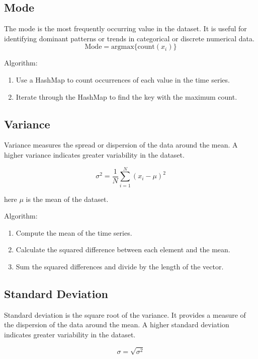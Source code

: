 \subsection{Mode}
The mode is the most frequently occurring value in the dataset. It is useful for identifying dominant patterns or trends in categorical or discrete numerical data.
\begin{equation}
    \text{Mode} = \text{arg} \text{max} \{ \text{count}(x_i) \}
\end{equation}

Algorithm:
\begin{enumerate}
    \item Use a HashMap to count occurrences of each value in the time series. 
    \item Iterate through the HashMap to find the key with the maximum count.
\end{enumerate}

\subsection{Variance}
Variance measures the spread or dispersion of the data around the mean. A higher variance indicates greater variability in the dataset.

\begin{equation}
    \sigma^2 = \dfrac{1}{N} \sum_{i=1}^{N} (x_i - \mu)^2
    \label{eq:variance}
\end{equation}

here $\mu$ is the mean of the dataset.

Algorithm:
\begin{enumerate}
    \item Compute the mean of the time series.
    \item Calculate the squared difference between each element and the mean.
    \item Sum the squared differences and divide by the length of the vector.
\end{enumerate}

\subsection{Standard Deviation}
Standard deviation is the square root of the variance. It provides a measure of the dispersion of the data around the mean. A higher standard deviation indicates greater variability in the dataset.

\begin{equation}
    \sigma = \sqrt{\sigma^2}
    \label{eq:std_dev}
\end{equation}

